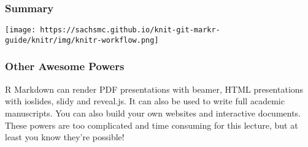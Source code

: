 \documentclass[
]{article}
\begin{document}
\hypertarget{summary}{%
\subsubsection{Summary}\label{summary}}

\texttt{[image: https://sachsmc.github.io/knit-git-markr-guide/knitr/img/knitr-workflow.png]}

\hypertarget{other-awesome-powers}{%
\subsubsection{Other Awesome Powers}\label{other-awesome-powers}}

R Markdown can render PDF presentations with beamer, HTML presentations
with ioslides, slidy and reveal.js. It can also be used to write full
academic manuscripts. You can also build your own websites and
interactive documents. These powers are too complicated and time
consuming for this lecture, but at least you know they're possible!
\end{document}

